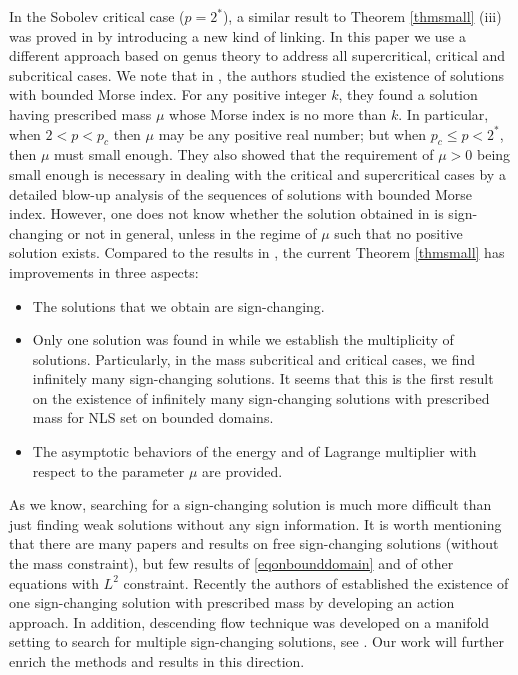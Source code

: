 \documentclass[10pt,a4paper]{article}
\theoremstyle{definition} \theoremstyle{remark}
\numberwithin{equation}{section}
\begin{document}
In the Sobolev critical case ($p = 2^*$), a similar result to Theorem \ref{thmsmall} (iii) was proved in \cite{SZ} by  introducing a new kind of linking. In this paper we use a different approach based on genus theory to address all supercritical, critical and subcritical cases.  We note that in \cite{PV}, the authors studied the existence of solutions with bounded Morse index. For any positive integer $k$, they found a solution having prescribed mass $\mu$ whose Morse index is no more than $k$. In particular,  when $2 < p < p_c$ 
 then $\mu$ may be any positive real number;  but when $p_c \le p < 2^*$, then $\mu$ must small enough. They also showed that the requirement of $\mu > 0$ being small enough  is necessary in dealing with the critical and supercritical cases by a detailed blow-up analysis of the sequences of solutions with bounded Morse index. However, one does not know whether the solution obtained in \cite{PV} is sign-changing or not in general, unless in the regime of $\mu$ such that no positive solution exists. Compared to the results in \cite{PV}, the current  Theorem \ref{thmsmall} has improvements in three aspects:
 
 
 
\begin{itemize}
	\item The solutions that we obtain are sign-changing.
	\item  {Only one solution was found in \cite{PV} while we establish the multiplicity of solutions. Particularly, in the mass subcritical and critical cases, we find infinitely many sign-changing solutions.} It seems that this is the first result on the existence of infinitely many sign-changing solutions  {with prescribed mass} for NLS set on bounded domains.
	\item The asymptotic behaviors of the energy and of Lagrange multiplier with respect to the parameter $\mu$ are provided.
\end{itemize}

As we know, searching for a sign-changing solution is much more difficult than just finding weak solutions without any sign information. It is worth mentioning that there are many papers and results on free sign-changing solutions (without the mass constraint), but few results of \eqref{eqonbounddomain} and of other equations with $L^2$ constraint. Recently the authors of \cite{CDDS} established  the existence of one sign-changing solution with prescribed mass by developing an action approach. In addition, descending flow technique was developed on a manifold setting to search for multiple sign-changing solutions, see \cite{JS,SZ}. Our work will further enrich the methods and results in this direction.
\end{document}
